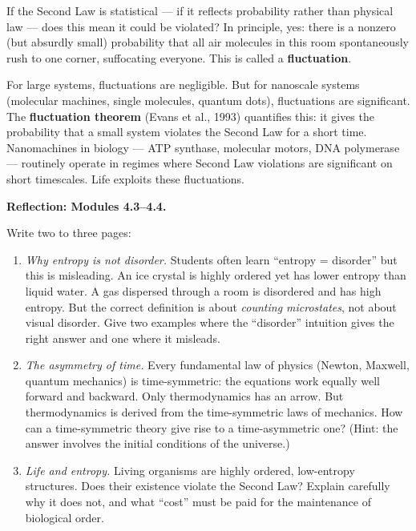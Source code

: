 \documentclass[12pt, a4paper, twoside]{book}
\begin{document}
\begin{deepquestion}
If the Second Law is statistical --- if it reflects probability rather than physical law --- does this mean it could be violated? In principle, yes: there is a nonzero (but absurdly small) probability that all air molecules in this room spontaneously rush to one corner, suffocating everyone. This is called a \textbf{fluctuation}. 

For large systems, fluctuations are negligible. But for nanoscale systems (molecular machines, single molecules, quantum dots), fluctuations are significant. The \textbf{fluctuation theorem} (Evans et al., 1993) quantifies this: it gives the probability that a small system violates the Second Law for a short time. Nanomachines in biology --- ATP synthase, molecular motors, DNA polymerase --- routinely operate in regimes where Second Law violations are significant on short timescales. Life exploits these fluctuations.
\end{deepquestion}

\begin{reflectionbox}
\textbf{Reflection: Modules 4.3--4.4.}

Write two to three pages:

\begin{enumerate}[leftmargin=2em,itemsep=6pt]
  \item \textit{Why entropy is not disorder.} Students often learn ``entropy = disorder'' but this is misleading. An ice crystal is highly ordered yet has lower entropy than liquid water. A gas dispersed through a room is disordered and has high entropy. But the correct definition is about \textit{counting microstates}, not about visual disorder. Give two examples where the ``disorder'' intuition gives the right answer and one where it misleads.

  \item \textit{The asymmetry of time.} Every fundamental law of physics (Newton, Maxwell, quantum mechanics) is time-symmetric: the equations work equally well forward and backward. Only thermodynamics has an arrow. But thermodynamics is derived from the time-symmetric laws of mechanics. How can a time-symmetric theory give rise to a time-asymmetric one? (Hint: the answer involves the initial conditions of the universe.)

  \item \textit{Life and entropy.} Living organisms are highly ordered, low-entropy structures. Does their existence violate the Second Law? Explain carefully why it does not, and what ``cost'' must be paid for the maintenance of biological order.
\end{enumerate}
\end{reflectionbox}
\end{document}
